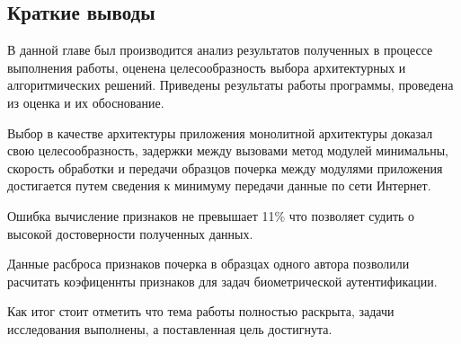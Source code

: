 \subsection{Краткие выводы}
В данной главе был производится анализ результатов полученных в процессе выполнения работы, оценена целесообразность выбора архитектурных и алгоритмических решений. Приведены результаты работы программы, проведена из оценка и их обоснование.

Выбор в качестве архитектуры приложения монолитной архитектуры доказал свою целесообразность, задержки между вызовами метод модулей минимальны, скорость обработки и передачи образцов почерка между модулями приложения достигается путем сведения к минимуму передачи данные по сети Интернет.

Ошибка вычисление признаков не превышает 11\% что позволяет судить о высокой достоверности полученных данных.

Данные расброса признаков почерка в образцах одного автора позволили расчитать коэфиценнты признаков для задач биометрической аутентификации.

Как итог стоит отметить что тема работы полностью раскрыта, задачи исследования выполнены, а  поставленная цель достигнута.